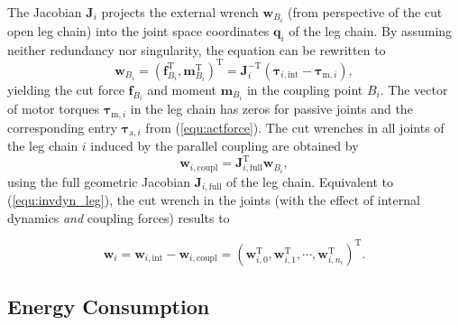 \documentclass[fleqn,a4paper,10pt]{article}
\newcommand{\bm}[1]{\mathbf{#1}}
\newcommand{\transp}[0]{{\mathrm{T}}}
\begin{document}
\begin{multicols}{2}
%
The Jacobian $\bm{J}_{i}$ projects the external wrench $\bm{w}_{B_i}$ (from perspective of the cut open leg chain) into the joint space coordinates $\bm{q}_i$ of the leg chain.
By assuming neither redundancy nor singularity, the equation can be rewritten to
%
\begin{equation}
\bm{w}_{B_i}
=
(\bm{f}_{B_i}^\transp, \bm{m}_{B_i}^\transp)^\transp
=
\bm{J}_{i}^{-\transp} (\bm{\tau}_{i,\mathrm{int}} - \bm{\tau}_{\mathrm{m},i}),
\label{equ:coupling_wrench_leg}
\end{equation}
%
yielding the cut force $\bm{f}_{B_i}$ and moment $\bm{m}_{B_i}$ in the coupling point $B_i$.
The vector of motor torques $\bm{\tau}_{\mathrm{m},i}$ in the leg chain has zeros for passive joints and the corresponding entry $\bm{\tau}_{\mathrm{a},i}$ from (\ref{equ:actforce}).
The cut wrenches in all joints of the leg chain $i$ induced by the parallel coupling are obtained by
%
\begin{equation}
\bm{w}_{i,\mathrm{coupl}}=\bm{J}_{i,\mathrm{full}}^{\transp} \bm{w}_{B_i},
\label{equ:intforce_fromcoupling}
\end{equation}
%
using the full geometric Jacobian $\bm{J}_{i,\mathrm{full}}$ of the leg chain.
Equivalent to (\ref{equ:invdyn_leg}), the cut wrench in the joints (with the effect of internal dynamics \emph{and} coupling forces) results to

\begin{equation}
\bm{w}_{i} 
= 
\bm{w}_{i,\mathrm{int}} - \bm{w}_{i,\mathrm{coupl}}
=
(\bm{w}_{i,0}^\transp,\bm{w}_{i,1}^\transp,\cdots,\bm{w}_{i,n_i}^\transp)^\transp.
\label{equ:intforce_total}
\end{equation}

\subsection{Energy Consumption}
\label{sec:energy}


\end{multicols}
\end{document}
